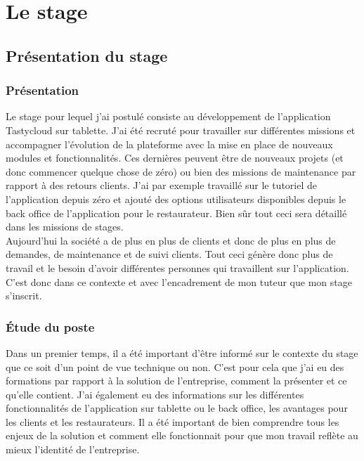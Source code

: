 \chapter{Le stage}
\label{chap:lestage}

\section{Présentation du stage}




\subsection{Présentation}

Le stage pour lequel j'ai postulé consiste au développement de l'application Tastycloud sur tablette. J'ai été recruté pour travailler sur différentes missions et accompagner l'évolution de la plateforme avec la mise en place de nouveaux modules et fonctionnalités. Ces dernières peuvent être de nouveaux projets (et donc commencer quelque chose de zéro) ou bien des missions de maintenance par rapport à des retours clients. J'ai par exemple travaillé sur le tutoriel de l'application depuis zéro et ajouté des options utilisateurs disponibles depuis le back office de l'application pour le restaurateur. Bien sûr tout ceci sera détaillé dans les missions de stages.\\

Aujourd'hui la société a de plus en plus de clients et donc de plus en plus de demandes, de maintenance et de suivi clients. Tout ceci génère donc plus de travail et le besoin d'avoir différentes personnes qui travaillent sur l'application. C'est donc dans ce contexte et avec l'encadrement de mon tuteur que mon stage s'inscrit.\\

\subsection{Étude du poste}

Dans un premier temps, il a été important d'être informé sur le contexte du stage que ce soit d'un point de vue technique ou non. C'est pour cela que j'ai eu des formations par rapport à la solution de l'entreprise, comment la présenter et ce qu'elle contient. J'ai également eu des informations sur les différentes fonctionnalités de l'application sur tablette ou le back office, les avantages pour les clients et les restaurateurs. Il a été important de bien comprendre tous les enjeux de la solution et comment elle fonctionnait pour que mon travail reflète au mieux l'identité de l'entreprise.\\

